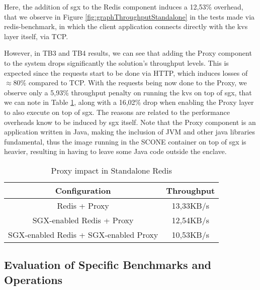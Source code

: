 Here, the addition of \gls{sgx} to the Redis component induces a 12,53\% overhead, that we observe in Figure \ref{fig:graphThroughputStandalone} in the tests made via redis-benchmark, in which the client application connects directly with the \gls{kvs} layer itself, via TCP. 

However, in TB3 and TB4 results, we can see that adding the Proxy component to the system drops significantly the solution's throughput levels. This is expected since the requests start to be done via HTTP, which induces losses of $\approx$80\% compared to TCP. With the requests being now done to the Proxy, we observe only a 5,93\% throughput penalty on running the \gls{kvs} on top of \gls{sgx}, that we can note in Table \ref{table:throughputSingleRedis}, along with a 16,02\% drop when enabling the Proxy layer to also execute on top of \gls{sgx}. The reasons are related to the performance overheads know to be induced by \gls{sgx} itself. Note that the Proxy component is an application written in Java, making the inclusion of JVM and other java libraries fundamental, thus the image running in the SCONE container on top of \gls{sgx} is heavier, resulting in having to leave some Java code outside the enclave.


\begin{table}[ht]
	\caption{Proxy impact in Standalone Redis} %
	\centering %
	\begin{tabular}{c c} %
		\hline\hline %
		\textbf{Configuration} & \textbf{Throughput} \\ [0.5ex] %
		\hline
		Redis + Proxy & 13,33KB/s\\
		\hline
		SGX-enabled Redis + Proxy & 12,54KB/s \\
		\hline %
		SGX-enabled Redis + SGX-enabled Proxy & 10,53KB/s\\ [1ex] %
		\hline %
	\end{tabular}
	\label{table:throughputSingleRedis} %
\end{table}



\subsection{Evaluation of Specific Benchmarks and Operations}
\label{ssec:specificBenchmarksRedisS}

